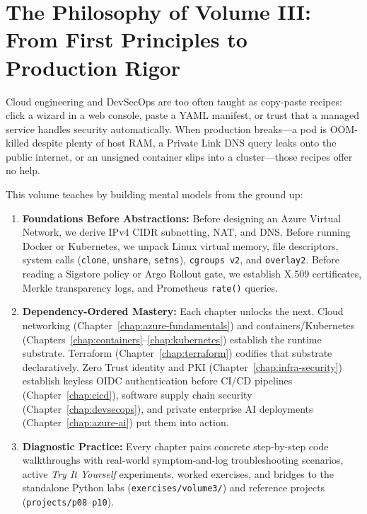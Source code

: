 \documentclass[11pt,oneside]{book}
\begin{document}
\section*{The Philosophy of Volume III: From First Principles to Production Rigor}
Cloud engineering and DevSecOps are too often taught as copy-paste recipes: click a wizard in a web console, paste a YAML manifest, or trust that a managed service handles security automatically. When production breaks---a pod is OOM-killed despite plenty of host RAM, a Private Link DNS query leaks onto the public internet, or an unsigned container slips into a cluster---those recipes offer no help.

This volume teaches by building mental models from the ground up:
\begin{enumerate}[leftmargin=15pt]
  \item \textbf{Foundations Before Abstractions:} Before designing an Azure Virtual Network, we derive IPv4 CIDR subnetting, NAT, and DNS. Before running Docker or Kubernetes, we unpack Linux virtual memory, file descriptors, system calls (\texttt{clone}, \texttt{unshare}, \texttt{setns}), \texttt{cgroups v2}, and \texttt{overlay2}. Before reading a Sigstore policy or Argo Rollout gate, we establish X.509 certificates, Merkle transparency logs, and Prometheus \texttt{rate()} queries.
  \item \textbf{Dependency-Ordered Mastery:} Each chapter unlocks the next. Cloud networking (Chapter~\ref{chap:azure-fundamentals}) and containers/Kubernetes (Chapters~\ref{chap:containers}--\ref{chap:kubernetes}) establish the runtime substrate. Terraform (Chapter~\ref{chap:terraform}) codifies that substrate declaratively. Zero Trust identity and PKI (Chapter~\ref{chap:infra-security}) establish keyless OIDC authentication before CI/CD pipelines (Chapter~\ref{chap:cicd}), software supply chain security (Chapter~\ref{chap:devsecops}), and private enterprise AI deployments (Chapter~\ref{chap:azure-ai}) put them into action.
  \item \textbf{Diagnostic Practice:} Every chapter pairs concrete step-by-step code walkthroughs with real-world symptom-and-log troubleshooting scenarios, active \emph{Try It Yourself} experiments, worked exercises, and bridges to the standalone Python labs (\texttt{exercises/volume3/}) and reference projects (\texttt{projects/p08}--\texttt{p10}).
\end{enumerate}
\end{document}
